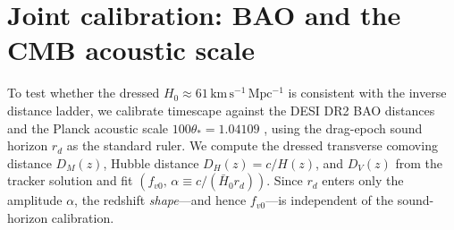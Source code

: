\documentclass[aps,prd,twocolumn,nofootinbib,superscriptaddress,floatfix]{revtex4-2}
\newcommand{\Ho}{H_{0}}
\newcommand{\Hbaro}{\bar H_{0}}
\newcommand{\fvo}{f_{v0}}
\newcommand{\kmsmpc}{\,\mathrm{km\,s^{-1}\,Mpc^{-1}}}
\begin{document}
\section{Joint calibration: BAO and the CMB acoustic scale}
\label{sec:baocmb}
To test whether the dressed $\Ho\approx61\kmsmpc$ is consistent with the inverse
distance ladder, we calibrate timescape against the DESI DR2 BAO distances
\cite{DESIDR2} and the Planck acoustic scale $100\theta_*=1.04109$
\cite{Planck2018}, using the drag-epoch sound horizon $r_d$ as the standard
ruler. We compute the dressed transverse comoving distance $D_M(z)$, Hubble
distance $D_H(z)=c/H(z)$, and $D_V(z)$ from the tracker solution and fit
$(\fvo,\,\alpha\equiv c/(\Hbaro r_d))$. Since $r_d$ enters only the amplitude
$\alpha$, the redshift \emph{shape}---and hence $\fvo$---is independent of the
sound-horizon calibration.
\end{document}
